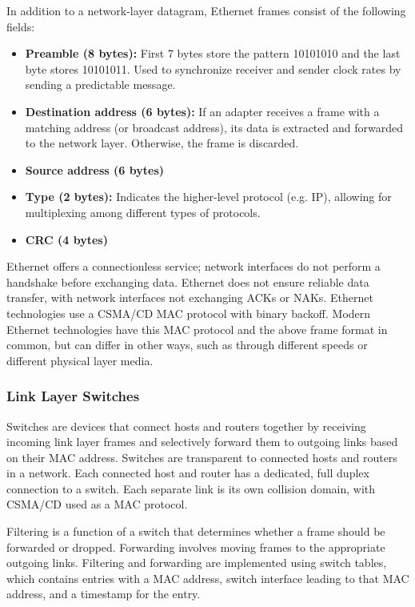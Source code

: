 \documentclass[12pt,titlepage]{article}
\begin{document}
        In addition to a network-layer datagram, Ethernet frames consist of the following fields:
        \begin{itemize}
          \item \textbf{Preamble (8 bytes):} First 7 bytes store the pattern 10101010 and the last byte stores 10101011. Used to synchronize receiver and sender clock
            rates by sending a predictable message.
          \item \textbf{Destination address (6 bytes):} If an adapter receives a frame with a matching address (or broadcast address), its data is extracted and
            forwarded to the network layer. Otherwise, the frame is discarded.
          \item \textbf{Source address (6 bytes)}
          \item \textbf{Type (2 bytes):} Indicates the higher-level protocol (e.g. IP), allowing for multiplexing among different types of protocols.
          \item \textbf{CRC (4 bytes)}
        \end{itemize}

        Ethernet offers a connectionless service; network interfaces do not perform a handshake before exchanging data. Ethernet does not ensure reliable data transfer,
        with network interfaces not exchanging ACKs or NAKs. Ethernet technologies use a CSMA/CD MAC protocol with binary backoff. Modern Ethernet technologies have
        this MAC protocol and the above frame format in common, but can differ in other ways, such as through different speeds or different physical layer media.

      \subsubsection{Link Layer Switches}
        Switches are devices that connect hosts and routers together by receiving incoming link layer frames and selectively forward them to outgoing links based on their
        MAC address. Switches are transparent to connected hosts and routers in a network. Each connected host and router has a dedicated, full duplex connection to
        a switch. Each separate link is its own collision domain, with CSMA/CD used as a MAC protocol.

        Filtering is a function of a switch that determines whether a frame should be forwarded or dropped. Forwarding involves moving frames to the appropriate outgoing
        links. Filtering and forwarding are implemented using switch tables, which contains entries with a MAC address, switch interface leading to that MAC address, and
        a timestamp for the entry.
\end{document}
